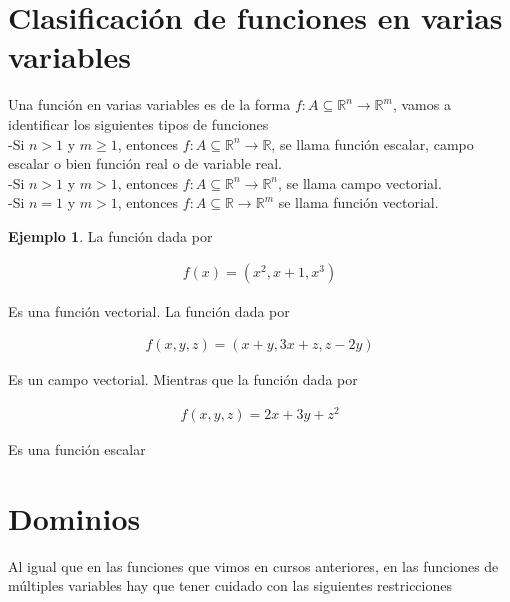 \documentclass{article}
\theoremstyle{plain}
\theoremstyle{definition}
\newtheorem{ejem}[thm]{Ejemplo}
\begin{document}
\section{Clasificación de funciones en varias variables}

Una función en varias variables es de la forma $f : A \subseteq \mathbb{R}^n \to \mathbb{R}^m$, vamos a identificar los siguientes tipos de funciones \\

-Si $n> 1$ y $m \geq 1 $, entonces $f : A \subseteq \mathbb{R}^n \to \mathbb{R}$, se llama función escalar, campo escalar o bien función real o de variable real. \\

-Si $n >1 $ y $m > 1$, entonces $f : A \subseteq \mathbb{R}^n \to \mathbb{R}^n$,  se llama campo vectorial. \\

-Si $n=1$ y $m > 1$, entonces $f : A \subseteq \mathbb{R} \to \mathbb{R}^m$ se llama función vectorial. \\



\begin{ejem}La función dada por
\end{ejem}

\begin{align*}
    f(x) =(x^2,x+1, x^3)
\end{align*}

Es una función vectorial. La función dada por

\begin{align*}
    f(x,y,z) =(x+y,3x+z, z-2y)
\end{align*}

Es un campo vectorial. Mientras que la función dada por

\begin{align*}
    f(x,y,z) = 2x+3y+z^2
\end{align*}

Es una función escalar

\newpage



\section{Dominios}


Al igual que en las funciones que vimos en cursos anteriores, en las funciones de múltiples variables hay que tener cuidado con las siguientes restricciones \\
\end{document}
